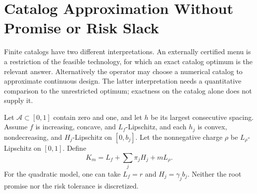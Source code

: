 \section{Catalog Approximation Without Promise or Risk Slack}\label{sec:grid}
Finite catalogs have two different interpretations. An externally certified menu is a restriction of the feasible technology, for which an exact catalog optimum is the relevant answer. Alternatively the operator may choose a numerical catalog to approximate continuous design. The latter interpretation needs a quantitative comparison to the unrestricted optimum; exactness on the catalog alone does not supply it.

Let $\mathcal A\subset[0,1]$ contain zero and one, and let $h$ be its largest consecutive spacing. Assume $f$ is increasing, concave, and $L_f$-Lipschitz, and each $h_j$ is convex, nondecreasing, and $H_j$-Lipschitz on $[0,b_j]$. Let the nonnegative charge $\rho$ be $L_\rho$-Lipschitz on $[0,1]$. Define
\begin{equation}\label{eq:mesh-constant}
 K_m=L_f+\sum_j\pi_jH_j+mL_\rho.
\end{equation}
For the quadratic model, one can take $L_f=r$ and $H_j=\gamma_jb_j$. Neither the root promise nor the risk tolerance is discretized.

